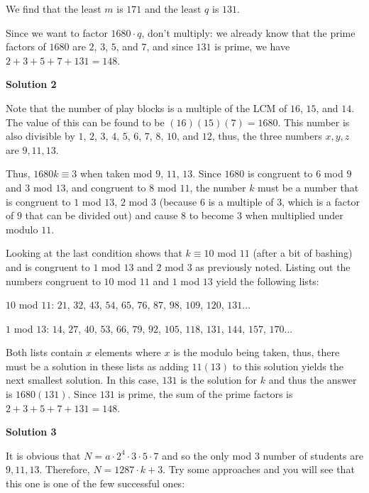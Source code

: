 \begin{enumerate}
 We find that the least $m$ is $171$ and the least $q$ is $131$. 

 Since we want to factor $1680\cdot q$, don't multiply: we already know that the prime factors of $1680$ are $2$, $3$, $5$, and $7$, and since $131$ is prime, we have $2 + 3 + 5 + 7 + 131 = \boxed{148}$.

 



\textbf{Solution 2}

Note that the number of play blocks is a multiple of the LCM of $16$, $15$, and $14$. The value of this can be found to be $(16)(15)(7) = 1680$. This number is also divisible by $1$, $2$, $3$, $4$, $5$, $6$, $7$, $8$, $10$, and $12$, thus, the three numbers $x, y, z$ are $9, 11, 13$.

 Thus, $1680k\equiv 3$ when taken mod $9$, $11$, $13$. Since $1680$ is congruent to $6$ mod $9$ and $3$ mod $13$, and congruent to $8$ mod $11$, the number $k$ must be a number that is congruent to $1$ mod $13$, $2$ mod $3$ (because $6$ is a multiple of $3$, which is a factor of $9$ that can be divided out) and cause $8$ to become $3$ when multiplied under modulo $11$.

 Looking at the last condition shows that $k\equiv 10$ mod $11$ (after a bit of bashing) and is congruent to $1$ mod $13$ and $2$ mod $3$ as previously noted. Listing out the numbers congruent to $10$ mod $11$ and $1$ mod $13$ yield the following lists:

 $10$ mod $11$: $21$, $32$, $43$, $54$, $65$, $76$, $87$, $98$, $109$, $120$, $131$...

 $1$ mod $13$: $14$, $27$, $40$, $53$, $66$, $79$, $92$, $105$, $118$, $131$, $144$, $157$, $170$...

 Both lists contain $x$ elements where $x$ is the modulo being taken, thus, there must be a solution in these lists as adding $11(13)$ to this solution yields the next smallest solution. In this case, $131$ is the solution for $k$ and thus the answer is $1680(131)$. Since $131$ is prime, the sum of the prime factors is $2 + 3 + 5 + 7 + 131 = \boxed{148}$.

 



\textbf{Solution 3}

It is obvious that $N=a\cdot 2^4 \cdot 3\cdot 5\cdot 7$ and so the only mod $3$ number of students are $9, 11, 13$. Therefore, $N=1287\cdot k+3$. Try some approaches and you will see that this one is one of the few successful ones:


\end{enumerate}
